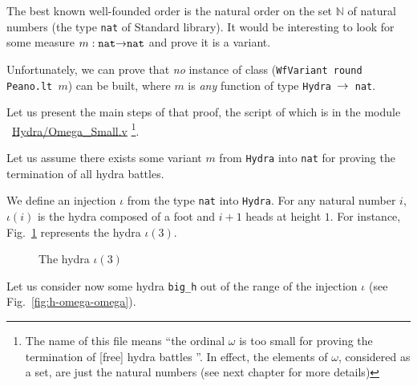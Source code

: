 The best known well-founded order is the natural order on the set $\mathbb{N}$ of natural numbers (the type \texttt{nat} of Standard library). It would be interesting to look for some measure $m:\texttt{nat}\mbox{$\rightarrow$}\texttt{nat}$ and prove it is a variant.

Unfortunately, we can prove that 
\emph{no} instance of class (\texttt{WfVariant round Peano.lt $m$}) can be built, where
$m$ is \emph{any} function of type \texttt{Hydra $\mbox{$\rightarrow$}$ nat}.


Let us present the main steps of that proof, the script of which  is in the module ~\href{../theories/html/hydras.Hydra.Omega_Small.html}{Hydra/Omega\_Small.v} \footnote{ The name of this file means ``the ordinal $\omega$ is too small for proving the termination of [free] hydra battles ''. In effect, the elements of $\omega$, considered as a set, are just the natural numbers (see next chapter for more details)}.



Let us assume there exists some variant $m$ from \texttt{Hydra} into \texttt{nat} for proving
    the  termination of all hydra battles.


    
We define an injection $\iota$ from the type \texttt{nat} into \texttt{Hydra}.
For any natural number $i$, $\iota(i)$ is the hydra composed of a foot and
$i+1$ heads at height $1$. For instance, Fig.~\ref{fig:flower} represents the hydra $\iota(3)$.

\begin{figure}[htb]
\centering
{}
\caption{\label{fig:flower}
The hydra $\iota(3)$}
\end{figure}



Let us consider now some hydra \texttt{big\_h} out of the range of the injection $\iota$ (see Fig.~\vref{fig:h-omega-omega}).

